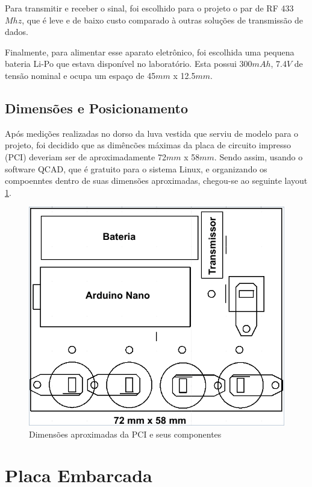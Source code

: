 \documentclass[
	12pt,				%
	openright,			%
	oneside,			%
	a4paper,			%
	english,			%
	brazil				%
	]{abntex2}
\begin{document}
			Para transmitir e receber o sinal, foi escolhido para o projeto o par de RF 433$Mhz$, que é leve e de baixo custo comparado à outras soluções de transmissão de dados.

			Finalmente, para alimentar esse aparato eletrônico, foi escolhida uma pequena bateria Li-Po que estava disponível no laboratório. Esta possui 300$mAh$, 7.4$V$ de tensão nominal e ocupa um espaço de 45$mm$ x 12.5$mm$.

			\subsection{Dimensões e Posicionamento}

			Após medições realizadas no dorso da luva vestida que serviu de modelo para o projeto, foi decidido que as dimêncões máximas da placa de circuito impresso (PCI) deveriam ser de aproximadamente 72$mm$ x 58$mm$. Sendo assim, usando o software QCAD, que é gratuito para o sistema Linux, e organizando os compoenntes dentro de suas dimensões aproximadas, chegou-se ao seguinte layout \ref{Fig:size-glove-module1}.

		\begin{figure}[h!]
			\centering
  		\includegraphics[scale=0.5]{figures/size-glove-module1.png}
			\caption{Dimensões aproximadas da PCI e seus componentes}
  		\label{Fig:size-glove-module1}
		\end{figure}

		\section{Placa Embarcada}
\end{document}

